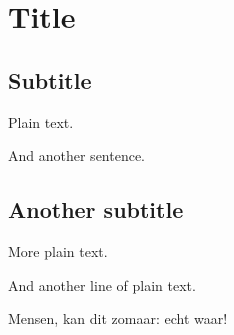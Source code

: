 \documentclass{article}
\begin{document}
\section{Title}


\subsection{Subtitle}

Plain text.

And another sentence.

\subsection{Another subtitle}

More plain text.

And another line of plain text.

Mensen, kan dit zomaar: echt waar!
\end{document}
